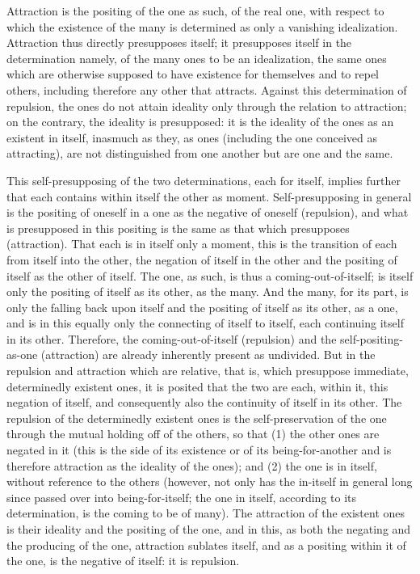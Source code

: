 Attraction is the positing of the one as such,
of the real one, with respect to which
the existence of the many is determined
as only a vanishing idealization.
Attraction thus directly presupposes itself;
it presupposes itself in the determination namely,
of the many ones to be an idealization,
the same ones which are otherwise supposed
to have existence for themselves and to repel others,
including therefore any other that attracts.
Against this determination of repulsion,
the ones do not attain ideality only through
the relation to attraction;
on the contrary, the ideality is presupposed:
it is the ideality of the ones
as an existent in itself,
inasmuch as they, as ones
(including the one conceived as attracting),
are not distinguished from one another
but are one and the same.

This self-presupposing of the two determinations, each for itself,
implies further that each contains within itself the other as moment.
Self-presupposing in general is the positing of oneself
in a one as the negative of oneself (repulsion),
and what is presupposed in this positing is
the same as that which presupposes (attraction).
That each is in itself only a moment,
this is the transition of each from itself into the other,
the negation of itself in the other
and the positing of itself as the other of itself.
The one, as such, is thus a coming-out-of-itself;
is itself only the positing of itself as its other, as the many.
And the many, for its part, is
only the falling back upon itself
and the positing of itself as its other, as a one,
and is in this equally only the connecting of itself to itself,
each continuing itself in its other.
Therefore, the coming-out-of-itself (repulsion)
and the self-positing-as-one (attraction)
are already inherently present as undivided.
But in the repulsion and attraction which are relative, that is,
which presuppose immediate, determinedly existent ones,
it is posited that the two are each, within it, this negation of itself,
and consequently also the continuity of itself in its other.
The repulsion of the determinedly existent ones is
the self-preservation of the one
through the mutual holding off of the others,
so that (1) the other ones are negated in it
(this is the side of its existence or of its being-for-another
and is therefore attraction as the ideality of the ones);
and (2) the one is in itself,
without reference to the others
(however, not only has the in-itself in general
long since passed over into being-for-itself;
the one in itself, according to its determination,
is the coming to be of many).
The attraction of the existent ones is their ideality
and the positing of the one, and in this,
as both the negating and the producing of the one,
attraction sublates itself,
and as a positing within it of the one,
is the negative of itself:
it is repulsion.

